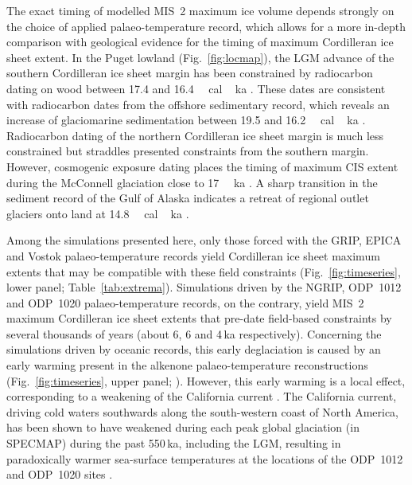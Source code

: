 \documentclass[tc]{copernicus}
\begin{document}
The exact timing of modelled MIS~2 maximum ice volume depends strongly on the
choice of applied palaeo-temperature record, which allows for a more in-depth
comparison with geological evidence for the timing of maximum Cordilleran ice
sheet extent. In the Puget lowland (Fig.~\ref{fig:locmap}), the LGM advance of
the southern Cordilleran ice sheet margin has been constrained by radiocarbon
dating on wood between 17.4 and 16.4\,\unit{\,cal\,ka}
\citep{Porter.Swanson.1998}. These dates are consistent with radiocarbon dates
from the offshore sedimentary record, which reveals
an increase of glaciomarine sedimentation between 19.5 and
16.2\,\unit{\,cal\,ka} \citep{Cosma.etal.2008, Taylor.etal.2014}.
Radiocarbon
dating of the northern Cordilleran ice sheet margin is much less constrained
but straddles presented constraints from the southern margin. However,
cosmogenic exposure dating places the timing of maximum CIS extent during the
McConnell glaciation close to 17\,\unit{\,ka}
\citep{Stroeven.etal.2010, Stroeven.etal.2014}. A sharp transition in
the sediment record of the Gulf of Alaska indicates a retreat of regional
outlet glaciers onto land at 14.8\,\unit{\,cal\,ka}
\citep{Davies.etal.2011}.

Among the simulations presented here, only those forced with the GRIP, EPICA
and Vostok palaeo-temperature records yield Cordilleran ice sheet maximum
extents that may be compatible with these field constraints
(Fig.~\ref{fig:timeseries}, lower panel; Table~\ref{tab:extrema}).
Simulations driven by the NGRIP, ODP~1012 and ODP~1020
palaeo-temperature records, on the contrary, yield MIS~2 maximum Cordilleran
ice sheet extents that pre-date field-based constraints by several thousands of
years (about 6, 6 and 4\,ka respectively).
Concerning the simulations driven by oceanic records, this early
deglaciation is caused by an early warming present in the alkenone
palaeo-temperature reconstructions (Fig.~\ref{fig:timeseries}, upper panel;
\citealp[Fig.~3]{Herbert.etal.2001}). However, this
early warming is a local effect, corresponding to a weakening of the California
current \citep{Herbert.etal.2001}. The California current, driving cold
waters southwards along the south-western coast of North America,
has been shown to have weakened during each peak global glaciation (in SPECMAP)
during the past 550\,ka, including the LGM, resulting in paradoxically warmer
sea-surface temperatures at the locations of the ODP~1012 and ODP~1020 sites
\citep{Herbert.etal.2001}.
\end{document}
